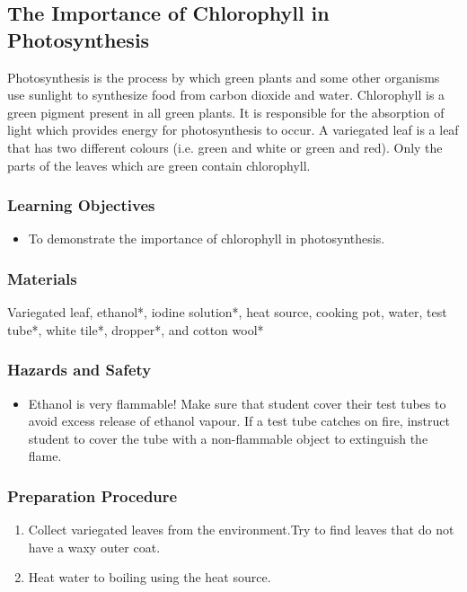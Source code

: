 \subsection{The Importance of Chlorophyll in Photosynthesis}
Photosynthesis is the process by which green plants and some other organisms use sunlight to synthesize food from carbon dioxide and water. Chlorophyll is a green pigment present in all green plants. It is responsible for the absorption of light which provides energy for photosynthesis to occur. A variegated leaf is a leaf that has two different colours (i.e. green and white or green and red). Only the parts of the leaves which are green contain chlorophyll.

\subsubsection*{Learning Objectives}
\begin{itemize}
\item{To demonstrate the importance of chlorophyll in photosynthesis.}
\end{itemize}

\subsubsection*{Materials}
Variegated leaf, ethanol*, iodine solution*, heat source, cooking pot, water, test tube*, white tile*, dropper*, and cotton wool*

\subsubsection*{Hazards and Safety}
\begin{itemize}
\item{Ethanol is very flammable! Make sure that student cover their test tubes to avoid excess release of ethanol vapour. If a test tube catches on fire, instruct student to cover the tube with a non-flammable object to extinguish the flame.}
\end{itemize}

\subsubsection*{Preparation Procedure}
\begin{enumerate}
\item{Collect variegated leaves from the environment.Try to find leaves that do not have a waxy outer coat.}
\item{Heat water to boiling using the heat source.}
\end{enumerate}

